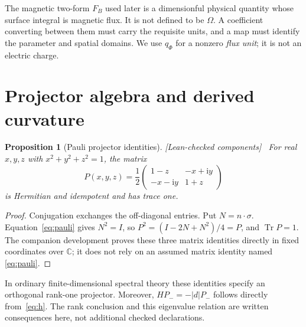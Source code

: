 \documentclass[11pt]{article}
\newtheorem{proposition}[theorem]{Proposition}
\theoremstyle{definition}\newtheorem{definition}[theorem]{Definition}
\theoremstyle{remark}\newtheorem{remark}[theorem]{Remark}
\newcommand{\Tr}{\operatorname{Tr}}
\newcommand{\ii}{\mathrm{i}}
\newcommand{\C}{\mathbb{C}}
\newcommand{\checked}{\textnormal{\small[Lean-checked components]}\ }
\begin{document}
The magnetic two-form $F_B$ used later is a dimensionful physical quantity whose surface integral is magnetic flux. It is not defined to be $\Omega$. A coefficient converting between them must carry the requisite units, and a map must identify the parameter and spatial domains. We use $q_\Phi$ for a nonzero \emph{flux unit}; it is not an electric charge.

\section{Projector algebra and derived curvature}
\begin{proposition}[Pauli projector identities]\label{prop:projector}\checked
For real $x,y,z$ with $x^2+y^2+z^2=1$, the matrix
\begin{equation}\label{eq:pentries}
 P(x,y,z)=\frac12\begin{pmatrix}
 1-z&-x+\ii y\\-x-\ii y&1+z
 \end{pmatrix}
\end{equation}
is Hermitian and idempotent and has trace one.
\end{proposition}
\begin{proof}
Conjugation exchanges the off-diagonal entries. Put $N=n\cdot\sigma$. Equation~\eqref{eq:pauli} gives $N^2=I$, so
$P^2=(I-2N+N^2)/4=P$, and $\Tr P=1$.
The companion development proves these three matrix identities directly in fixed coordinates over $\C$; it does not rely on an assumed matrix identity named \eqref{eq:pauli}.
\end{proof}
In ordinary finite-dimensional spectral theory these identities specify an orthogonal rank-one projector. Moreover, $HP_-=-|d|P_-$ follows directly from~\eqref{eq:h}. The rank conclusion and this eigenvalue relation are written consequences here, not additional checked declarations.
\end{document}
